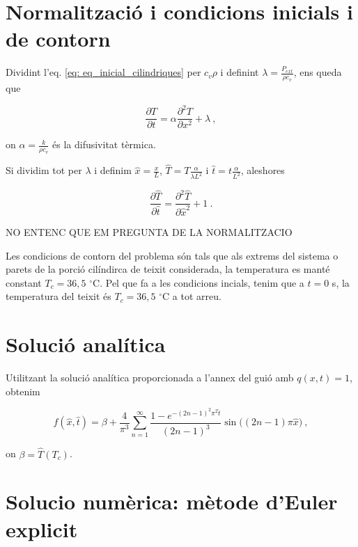 \documentclass[11pt]{article}
\begin{document}
\section{Normalització i condicions inicials i de contorn}

Dividint l'eq. \eqref{eq: eq_inicial_cilindriques} per $c_v\rho$ i definint $\lambda=\frac{P_{ext}}{\rho c_v}$, ens queda que

\begin{equation}
    \frac{\partial T}{\partial t} = \alpha \frac{\partial^2 T}{\partial x^2} + \lambda \ ,
\label{eq: eq_entre_rhocv}
\end{equation}

on $\alpha=\frac{k}{\rho c_v}$ és la difusivitat tèrmica.

Si dividim tot per $\lambda$ i definim $\hat{x}=\frac{x}{L}$, $\hat{T}=T \frac{\alpha}{\lambda L^2}$ i $\hat{t}=t\frac{\alpha}{L^2}$, aleshores

\begin{equation}
    \frac{\partial \hat{T}}{\partial \hat{t}} = \frac{\partial^2 \hat{T}}{\partial \hat{x}^2} + 1 \ .
\label{eq: eq_normalitzada}
\end{equation}

NO ENTENC QUE EM PREGUNTA DE LA NORMALITZACIO

Les condicions de contorn del problema són tals que als extrems del sistema o parets de la porció cilíndirca de teixit considerada, la temperatura es manté constant $T_c=36,5$ $^\circ$C. Pel que fa a les condicions incials, tenim que a $t=0$ s, la temperatura del teixit és $T_c=36,5$ $^\circ$C a tot arreu.

\section{Solució analítica}

Utilitzant la solució analítica proporcionada a l'annex del guió amb $q(x,t)=1$, obtenim

\begin{equation}
    f(\hat{x}, \hat{t}) = \beta + \frac{4}{\pi^3} \sum_{n=1}^{\infty} \frac{1 - e^{-(2n-1)^2 \pi^2 \hat{t}}}{(2n-1)^3} \sin\big((2n-1)\pi \hat{x}) \ ,
\label{eq: analitica}
\end{equation}

on $\beta=\hat{T}(T_c)$.


\section{Solucio numèrica: mètode d'Euler explicit}
\end{document}
